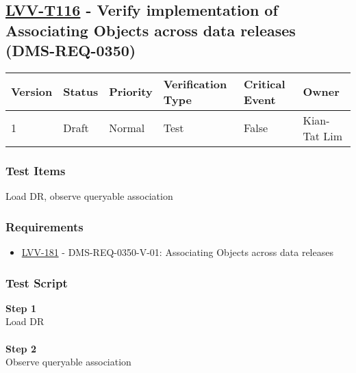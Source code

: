 \hypertarget{lvv-t116---verify-implementation-of-associating-objects-across-data-releases-dms-req-0350}{%
\subsection{\texorpdfstring{\href{https://jira.lsstcorp.org/secure/Tests.jspa\#/testCase/LVV-T116}{LVV-T116}
- Verify implementation of Associating Objects across data releases
(DMS-REQ-0350)}{LVV-T116 - Verify implementation of Associating Objects across data releases (DMS-REQ-0350)}}\label{lvv-t116---verify-implementation-of-associating-objects-across-data-releases-dms-req-0350}}

\begin{longtable}[]{@{}llllll@{}}
\toprule
Version & Status & Priority & Verification Type & Critical Event &
Owner\tabularnewline
\midrule
\endhead
1 & Draft & Normal & Test & False & Kian-Tat Lim\tabularnewline
\bottomrule
\end{longtable}

\hypertarget{test-items-16}{%
\subsubsection{Test Items}\label{test-items-16}}

Load DR, observe queryable association

\hypertarget{requirements-16}{%
\subsubsection{Requirements}\label{requirements-16}}

\begin{itemize}
\tightlist
\item
  \href{https://jira.lsstcorp.org/browse/LVV-181}{LVV-181} -
  DMS-REQ-0350-V-01: Associating Objects across data releases
\end{itemize}

\hypertarget{test-script-16}{%
\subsubsection{Test Script}\label{test-script-16}}

\textbf{Step 1}\\
Load DR\\
~\\
\textbf{Step 2}\\
Observe queryable association\\
~\\

